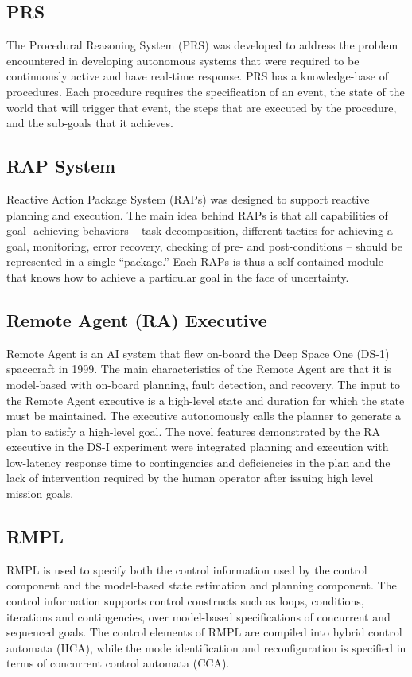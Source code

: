 \documentclass[conference]{IEEEtran}
\begin{document}
\subsection{\textbf{PRS}}\label{sec:prs}
The Procedural Reasoning System (PRS) was developed to address the problem encountered in developing autonomous systems that were required to be continuously active and have real-time response. PRS has a knowledge-base of procedures. Each procedure requires the specification of an event, the state of the world that will trigger that event, the steps that are executed by the procedure, and the sub-goals that it achieves.

\subsection{\textbf{RAP System}}\label{sec:rap}
Reactive Action Package System (RAPs) was designed to support reactive planning and execution. 
The main idea behind RAPs is that all capabilities of goal- achieving behaviors – task decomposition, different tactics for achieving a goal, monitoring, error recovery, checking of pre- and post-conditions – should be represented in a single “package.” Each RAPs is thus a self-contained module that knows how to achieve a particular goal in the face of uncertainty.

\subsection{\textbf{Remote Agent (RA) Executive}}\label{sec:ra}
Remote Agent is an AI system that flew on-board the Deep Space One (DS-1) spacecraft in 1999. The main characteristics of the Remote Agent are that it is model-based with on-board planning, fault detection, and recovery. The input to the Remote Agent executive is a high-level state and duration for which the state must be maintained. The executive autonomously calls the planner to generate a plan to satisfy a high-level goal. The novel features demonstrated by the RA executive in the DS-I experiment were integrated planning and execution with low-latency response time to contingencies and deficiencies in the plan and the lack of intervention required by the human operator after issuing high level mission goals. 

\subsection{\textbf{RMPL}}\label{sec:rmpl}
RMPL is used to specify both the control information used by the control component and the model-based state estimation and planning component. The control information supports control constructs such as loops, conditions, iterations and contingencies, over model-based specifications of concurrent and sequenced goals. The control elements of RMPL are compiled into hybrid control automata (HCA), while the mode identification and reconfiguration is specified in terms of concurrent control automata (CCA).
\end{document}
